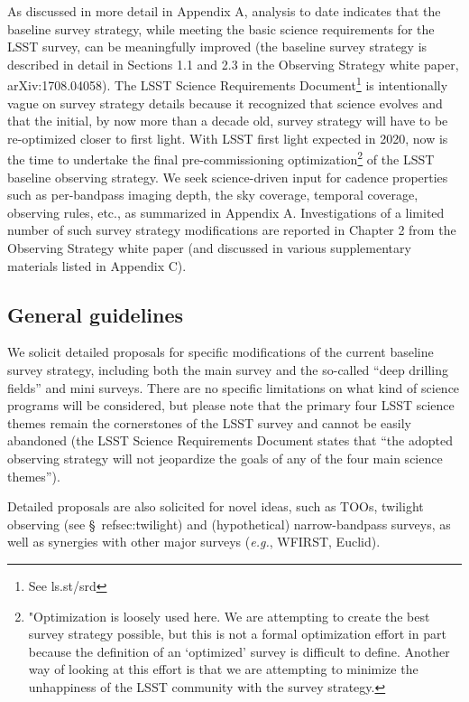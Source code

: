 \documentclass[DM,lsstdraft,toc,usenatbib]{lsstdoc}
\begin{document}
As discussed in more detail in Appendix A, analysis to date indicates that the baseline 
survey strategy, while meeting the basic science requirements for the LSST survey, can be meaningfully 
improved (the baseline survey strategy is described in detail in Sections 1.1 and 2.3 in the Observing Strategy
white paper, arXiv:1708.04058). The LSST Science Requirements Document\footnote{See ls.st/srd} 
is intentionally vague on survey strategy details because it recognized that science evolves and that the 
initial, by now more than a decade old, survey strategy will have to be re-optimized closer to first 
light. With LSST first light expected in 2020, now is the time to undertake the final pre-commissioning
optimization\footnote{"Optimization is loosely used here. We are attempting to create the best survey strategy possible,
but this is not a formal optimization effort in part because the definition of an `optimized' survey is difficult to define. Another way
of looking at this effort is that we are attempting to minimize the unhappiness of the LSST community with the survey strategy.}
of the LSST baseline observing strategy. We seek science-driven input for cadence 
properties such as per-bandpass imaging depth, the sky coverage, temporal coverage, observing
rules, etc., as summarized in Appendix A. Investigations of a limited number of such survey strategy 
modifications are reported in Chapter 2 from the Observing Strategy white paper (and discussed 
in various supplementary materials listed in Appendix C). 


\subsection{General guidelines} 

We solicit detailed proposals for specific modifications of the current baseline survey strategy, including 
both the main survey and the so-called ``deep drilling fields'' and mini surveys. There are no 
specific limitations on what kind of science programs will be considered, but please note that 
the primary four LSST science themes remain the cornerstones of the LSST survey and cannot 
be easily abandoned (the LSST Science Requirements Document states that ``the adopted observing 
strategy will not jeopardize the goals of any of the four main science themes''). 

Detailed proposals are also solicited for novel ideas, such as TOOs, twilight observing (see \S~ref{sec:twilight}) and 
(hypothetical) narrow-bandpass surveys, as well as synergies with other major surveys ({\it e.g.}, WFIRST, Euclid). 
\end{document}
